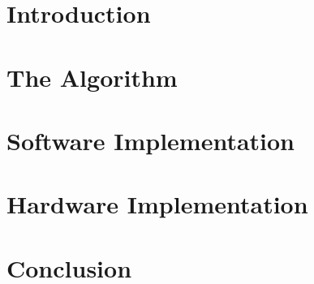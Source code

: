 \documentclass{beamer}
\title{\texorpdfstring{\thesisTitle*{}}{\thesisTitle}}
\author[\studentName*{}]{\texorpdfstring{\studentName*{}\\{\tiny{Supervisor: \supervisorName*{}}}}{\studentName*{}}}
\date{\thesisDate*{}}
\institute{\universityName*{}}
\begin{document}
\begin{frame}[shrink]
    \titlepage
\end{frame}

\section{Introduction}
\label{introduction}


\section{The Algorithm}
\label{algorithm}


\section{Software Implementation}
\label{software}


\section{Hardware Implementation}
\label{hardware}


\section{Conclusion}
\label{conclusion}

\end{document}
